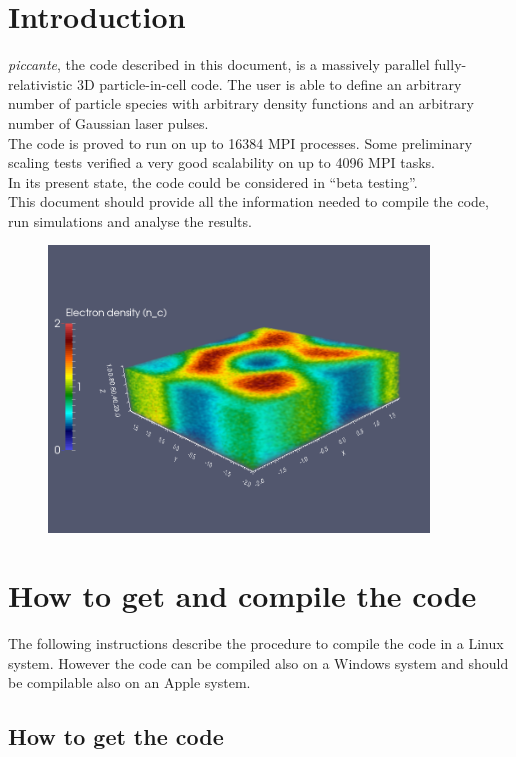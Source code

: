 \documentclass[11pt,a4paper]{report}
\begin{document}
\chapter{Introduction}
\emph{piccante}, the code described in this document, is a massively parallel fully-relativistic 3D particle-in-cell code. The user is able to define an arbitrary number of particle species with arbitrary density functions and an arbitrary number of Gaussian laser pulses.\\
The code is proved to run on up to 16384 MPI processes. Some preliminary scaling tests verified a very good scalability on up to 4096 MPI tasks.\\
In its present state, the code could be considered in ``beta testing''.\\
This document should provide all the information needed to compile the code, run simulations and analyse the results.
\begin{figure}[h!]
\centering
\includegraphics[width=0.9\textwidth]{3d_marta.png}
\end{figure}



\chapter{How to get and compile the code}
The following instructions describe the procedure to compile the code in a Linux system. However the code can be compiled also on a Windows system and should be compilable also on an Apple system.
\section{How to get the code} \label{section_getcode}
\end{document}
